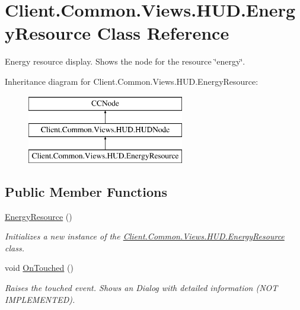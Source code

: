 \hypertarget{classClient_1_1Common_1_1Views_1_1HUD_1_1EnergyResource}{}\section{Client.\+Common.\+Views.\+H\+U\+D.\+Energy\+Resource Class Reference}
\label{classClient_1_1Common_1_1Views_1_1HUD_1_1EnergyResource}


Energy resource display. Shows the node for the resource \char`\"{}energy\char`\"{}.  


Inheritance diagram for Client.\+Common.\+Views.\+H\+U\+D.\+Energy\+Resource\+:\begin{figure}[H]
\begin{center}
\leavevmode
\includegraphics[height=3.000000cm]{classClient_1_1Common_1_1Views_1_1HUD_1_1EnergyResource}
\end{center}
\end{figure}
\subsection*{Public Member Functions}
\begin{DoxyCompactItemize}
\item 
\hyperlink{classClient_1_1Common_1_1Views_1_1HUD_1_1EnergyResource_a1a84be584a20c1f53961b517e3f5fecb}{Energy\+Resource} ()
\begin{DoxyCompactList}\small\item\em Initializes a new instance of the \hyperlink{classClient_1_1Common_1_1Views_1_1HUD_1_1EnergyResource}{Client.\+Common.\+Views.\+H\+U\+D.\+Energy\+Resource} class. \end{DoxyCompactList}\item 
void \hyperlink{classClient_1_1Common_1_1Views_1_1HUD_1_1EnergyResource_a5df5cb724fa0dc76758685bba206fdd6}{On\+Touched} ()
\begin{DoxyCompactList}\small\item\em Raises the touched event. Shows an Dialog with detailed information (N\+O\+T I\+M\+P\+L\+E\+M\+E\+N\+T\+E\+D). \end{DoxyCompactList}\end{DoxyCompactItemize}
